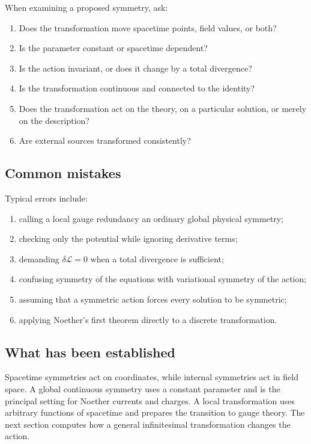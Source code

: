 When examining a proposed symmetry, ask:

\begin{enumerate}
    \item Does the transformation move spacetime points, field values, or both?
    \item Is the parameter constant or spacetime dependent?
    \item Is the action invariant, or does it change by a total divergence?
    \item Is the transformation continuous and connected to the identity?
    \item Does the transformation act on the theory, on a particular solution, or merely on the description?
    \item Are external sources transformed consistently?
\end{enumerate}

\subsection{Common mistakes}

Typical errors include:

\begin{enumerate}
    \item calling a local gauge redundancy an ordinary global physical symmetry;
    \item checking only the potential while ignoring derivative terms;
    \item demanding \(\delta\mathcal{L}=0\) when a total divergence is sufficient;
    \item confusing symmetry of the equations with variational symmetry of the action;
    \item assuming that a symmetric action forces every solution to be symmetric;
    \item applying Noether's first theorem directly to a discrete transformation.
\end{enumerate}

\subsection{What has been established}

Spacetime symmetries act on coordinates, while internal symmetries act in field space. A global continuous symmetry uses a constant parameter and is the principal setting for Noether currents and charges. A local transformation uses arbitrary functions of spacetime and prepares the transition to gauge theory. The next section computes how a general infinitesimal transformation changes the action.

